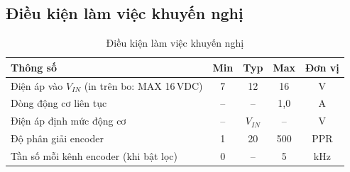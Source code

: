 \subsection{Điều kiện làm việc khuyến nghị}
\begin{table}[H]
\centering\small
\caption{Điều kiện làm việc khuyến nghị}
\label{tab:recommended}
\begin{tabularx}{\linewidth}{@{}Xcccc@{}}
\toprule
\textbf{Thông số} & \textbf{Min} & \textbf{Typ} & \textbf{Max} & \textbf{Đơn vị}\\
\midrule
Điện áp vào $V_{IN}$ (in trên bo: MAX 16\,VDC) & 7 & 12 & 16 & \si{\volt}\\
Dòng động cơ liên tục & -- & -- & 1,0 & \si{\ampere}\\
Điện áp định mức động cơ & -- & $V_{IN}$ & -- & \si{\volt}\\
Độ phân giải encoder  & 1 & 20 & 500 & PPR\\
Tần số mỗi kênh encoder (khi bật lọc) & 0 & -- & 5 & \si{\kilo\hertz}\\
\bottomrule
\end{tabularx}
\end{table}

